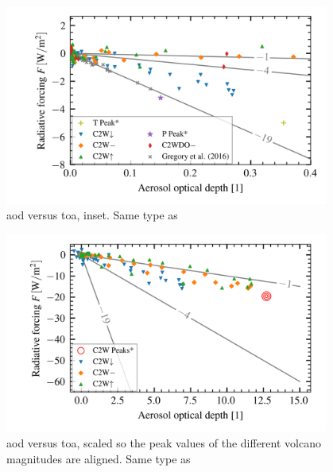 \documentclass{ametsocV5}
\begin{document}
\begin{figure}
  \begin{center}
    \includegraphics[width=0.95\textwidth]{figures/aod_vs_toa_avg_inset.png}
  \end{center}
  \caption{\acrshort{aod} versus \acrshort{toa}, inset. Same type as \cite{gregory2016}}
  \label{fig:aod_vs_toa_inset}
\end{figure}

\begin{figure}
  \begin{center}
    \includegraphics[width=0.95\textwidth]{figures/aod_vs_toa_avg_scaled.png}
  \end{center}
  \caption{
    \acrshort{aod} versus \acrshort{toa}, scaled so the peak values of the different volcano magnitudes
    are aligned. Same type as \cite{gregory2016}
  }
  \label{fig:aod_vs_toa_scaled}
\end{figure}
\end{document}
